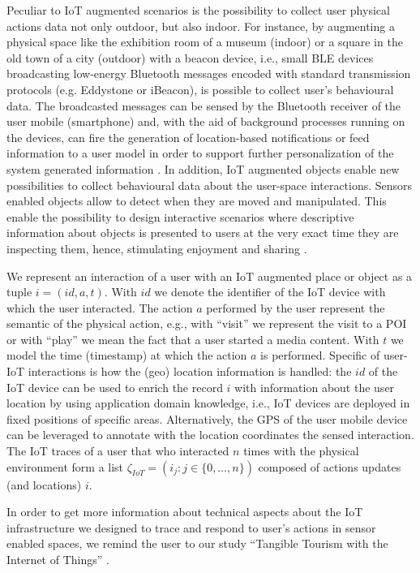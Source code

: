Peculiar to IoT augmented scenarios is the possibility to collect user physical actions data not only outdoor, but also indoor. For instance, by augmenting a physical space like the exhibition room of a museum (indoor) or a square in the old town of a city (outdoor) with a beacon device, i.e., small BLE devices broadcasting low-energy Bluetooth messages encoded with standard transmission protocols (e.g. Eddystone or iBeacon), is possible to collect user's behavioural data. The broadcasted messages can be sensed by the Bluetooth receiver of the user mobile (smartphone) and, with the aid of background processes running on the devices, can fire the generation of location-based notifications or feed information to a user model in order to support further personalization of the system generated information \cite{iot:beaconinteracton:Ng:2017}.
In addition, IoT augmented objects enable new possibilities to collect behavioural data about the user-space interactions. Sensors enabled objects allow to detect when they are moved and manipulated. This enable the possibility to design interactive scenarios where descriptive information about objects is presented to users at the very exact time they are inspecting them, hence, stimulating enjoyment and sharing \cite{iot:tangibleinteraction:2009}.

We represent an interaction of a user with an IoT augmented place or object as a tuple $i=(id, a, t)$. With $id$ we denote the identifier of the IoT device with which the user interacted. The action $a$ performed by the user represent the semantic of the physical action, e.g., with ``visit'' we represent the visit to a POI or with ``play'' we mean the fact that a user started a media content. With $t$ we model the time (timestamp) at which the action $a$ is performed. Specific of user-IoT interactions is how the (geo) location information is handled: the $id$ of the IoT device can be used to enrich the record $i$ with information about the user location by using application domain knowledge, i.e., IoT devices are deployed in fixed positions of specific areas. Alternatively, the GPS of the user mobile device can be leveraged to annotate with the location coordinates the sensed interaction. The IoT traces of a user that who interacted $n$ times with the physical environment form a list 
$\zeta_{IoT} = (i_j : j \in \{ 0, \dots, n\})$ 
composed of actions updates (and locations) $i$.

In order to get more information about technical aspects about the IoT infrastructure we designed to trace and respond to user's actions in sensor enabled spaces, we remind the user to our study ``Tangible Tourism with the Internet of Things'' \cite{massimo:enter2018}. 

